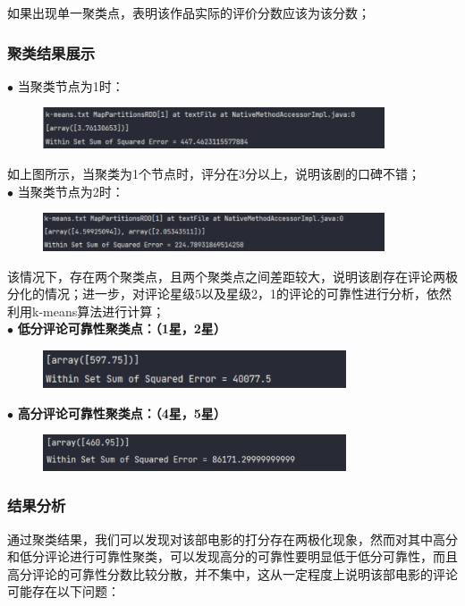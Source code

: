 \documentclass[12pt,a4paper,utf8]{article}
\begin{document}
如果出现单一聚类点，表明该作品实际的评价分数应该为该分数；

\subsubsection{聚类结果展示}
$\bullet$ 当聚类节点为1时：
\begin{figure}[H]
    \centering
    \includegraphics[width=0.9\textwidth]{images/1.png}  
\end{figure}   

如上图所示，当聚类为1个节点时，评分在3分以上，说明该剧的口碑不错；\\

$\bullet$ 当聚类节点为2时：
\begin{figure}[H]
    \centering
    \includegraphics[width=0.9\textwidth]{images/2.png}  
\end{figure}   
该情况下，存在两个聚类点，且两个聚类点之间差距较大，说明该剧存在评论两极分化的情况；进一步，对评论星级5以及星级2，1的评论的可靠性进行分析，依然利用k-means算法进行计算；\\

$\bullet$ \textbf{低分评论可靠性聚类点：（1星，2星）}
\begin{figure}[H]
    \centering
    \includegraphics[width=0.8\textwidth]{images/3.png}  
\end{figure}  

$\bullet$ \textbf{高分评论可靠性聚类点：（4星，5星）}

\begin{figure}[H]
    \centering
    \includegraphics[width=0.8\textwidth]{images/4.png}  
\end{figure}  

\subsubsection{结果分析}
通过聚类结果，我们可以发现对该部电影的打分存在两极化现象，然而对其中高分和低分评论进行可靠性聚类，可以发现高分的可靠性要明显低于低分可靠性，而且高分评论的可靠性分数比较分散，并不集中，这从一定程度上说明该部电影的评论可能存在以下问题：\\
\end{document}

